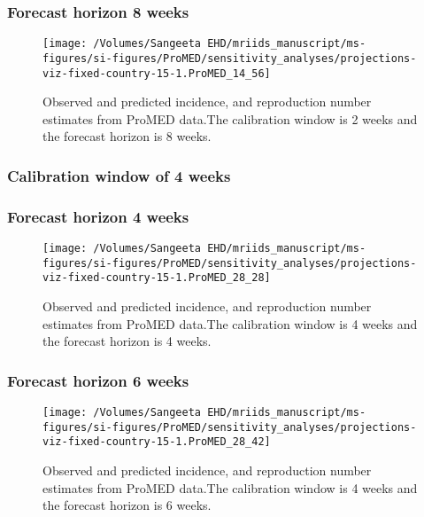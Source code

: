 \documentclass[9pt,twoside,lineno]{pnas-new}
\begin{document}
\subsubsection{Forecast horizon 8 weeks}\label{forecast-horizon-8-weeks-9}

\begin{figure}

  \centering 
\texttt{[image: /Volumes/Sangeeta EHD/mriids\_manuscript/ms-figures/si-figures/ProMED/sensitivity\_analyses/projections-viz-fixed-country-15-1.ProMED\_14\_56]} 
  \caption{Observed and predicted incidence, and reproduction number
    estimates from ProMED data.The calibration window is 2 weeks and
    the forecast horizon is 8 weeks.}
\label{fig:pm28ul10}
\end{figure}\FloatBarrier


\subsubsection{Calibration window of 4 weeks}\label{calibration-window-of-4-weeks-3}
\subsubsection{Forecast horizon 4 weeks}\label{forecast-horizon-4-weeks-9}

\begin{figure}
    \centering \texttt{[image: /Volumes/Sangeeta EHD/mriids\_manuscript/ms-figures/si-figures/ProMED/sensitivity\_analyses/projections-viz-fixed-country-15-1.ProMED\_28\_28]} 
  \caption{Observed and predicted incidence, and reproduction number
    estimates from ProMED data.The calibration window is 4 weeks and
    the forecast horizon is 4 weeks.}
  \label{fig:pm44ul10}
\end{figure}\FloatBarrier

\subsubsection{Forecast horizon 6 weeks}\label{forecast-horizon-6-weeks-10}

\begin{figure}
  \centering \texttt{[image: /Volumes/Sangeeta EHD/mriids\_manuscript/ms-figures/si-figures/ProMED/sensitivity\_analyses/projections-viz-fixed-country-15-1.ProMED\_28\_42]} 
  \caption{Observed and predicted incidence, and reproduction number
    estimates from ProMED data.The calibration window is 4 weeks and
    the forecast horizon is 6 weeks.}
  \label{fig:pm46ul10}
\end{figure}\FloatBarrier
\end{document}
